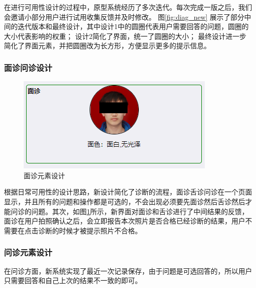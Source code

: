 在进行可用性设计的过程中，原型系统经历了多次迭代。每次完成一版之后，我们会邀请小部分用户进行试用收集反馈并及时修改。
图\ref{fig:diag_new} 展示了部分中间的迭代版本和最终设计，其中设计1中的圆圈代表用户需要回答的问题，圆圈的大小代表影响的权重；
设计2简化了界面，统一了圆圈的大小；
最终设计进一步简化了界面元素，并把圆圈改为长方形，方便显示更多的提示信息。

\subsubsection{面诊问诊设计}

\begin{figure}[h]
    \centering
    \includegraphics[]{images/diag_design.png}
    \caption{面诊元素设计}
    \label{fig:diag_design}
\end{figure}

根据日常可用性的设计思路，新设计简化了诊断的流程，面诊舌诊问诊在一个页面显示，并且所有的问题和操作都是可选的，不会出现必须要先面诊然后舌诊然后才能问诊的问题。其次，如图\ref{fig:diag_design}所示，新界面对面诊和舌诊进行了中间结果的反馈，面诊在用户拍照确认之后，会立即报告本次照片是否合格已经诊断的结果，用户不需要在点击诊断的时候才被提示照片不合格。

\subsubsection{问诊元素设计}
在问诊方面，新系统实现了最近一次记录保存，由于问题是可选回答的，所以用户只需要回答和自己上次的结果不一致的即可。


